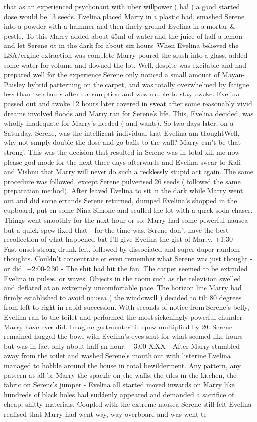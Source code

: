 \documentclass[12pt]{book}
\begin{document}
that as an experienced psychonaut with uber willpower ( ha! ) a good started dose would be 13 seeds. Evelina placed Marry in a plastic bad, smashed Serene into a powder with a hammer and then finely ground Evelina in a mortar \& pestle. To this Marry added about 45ml of water and the juice of half a lemon and let Serene sit in the dark for about six hours. When Evelina believed the LSA/ergine extraction was complete Marry poured the slush into a glass, added some water for volume and downed the lot. Well, despite was excitable and had prepared well for the experience Serene only noticed a small amount of Mayan-Paisley hybrid patterning on the carpet, and was totally overwhelmed by fatigue less than two hours after consumption and was unable to stay awake. Evelina passed out and awoke 12 hours later covered in sweat after some reasonably vivid dreams involved floods and Marry ran for Serene's life. This, Evelina decided, was wholly inadequate for Marry's needed ( and wants). So two days later, on a Saturday, Serene, was the intelligent individual that Evelina am thoughtWell, why not simply double the dose and go balls to the wall? Marry can't be that strong'. This was the decision that resulted in Serene was in total kill-me-now-please-god mode for the next three days afterwards and Evelina swear to Kali and Vishnu that Marry will never do such a recklessly stupid act again. The same procedure was followed, except Serene pulverised 26 seeds ( followed the same preparation method). After leaved Evelina to sit in the dark while Marry went out and did some errands Serene returned, dumped Evelina's shopped in the cupboard, put on some Nina Simone and sculled the lot with a quick soda chaser. Things went smoothly for the next hour or so; Marry had some powerful nausea but a quick spew fixed that - for the time was. Serene don't have the best recollection of what happened but I'll give Evelina the gist of Marry. +1:30 - Fast-onset strong drunk felt, followed by dissociated and super duper random thoughts. Couldn't concentrate or even remember what Serene was just thought - or did. +2:00-2:30 - The shit had hit the fan. The carpet seemed to be extruded Evelina in pulses, or waves. Objects in the room such as the television swelled and deflated at an extremely uncomfortable pace. The horizon line Marry had firmly established to avoid nausea ( the windowsill ) decided to tilt 80 degrees from left to right in rapid succession. With seconds of notice from Serene's belly, Evelina ran to the toilet and performed the most sickeningly powerful chunder Marry have ever did. Imagine gastroenteritis spew multiplied by 20. Serene remained hugged the bowl with Evelina's eyes shut for what seemed like hours but was in fact only about half an hour. +3:00-X:XX - After Marry stumbled away from the toilet and washed Serene's mouth out with listerine Evelina managed to hobble around the house in total bewilderment. Any pattern, any pattern at all be Marry the spackle on the walls, the tiles in the kitchen, the fabric on Serene's jumper - Evelina all started moved inwards on Marry like hundreds of black holes had suddenly appeared and demanded a sacrifice of cheap, shitty materials. Coupled with the extreme nausea Serene still felt Evelina realised that Marry had went way, way overboard and was went to 
\end{document}
